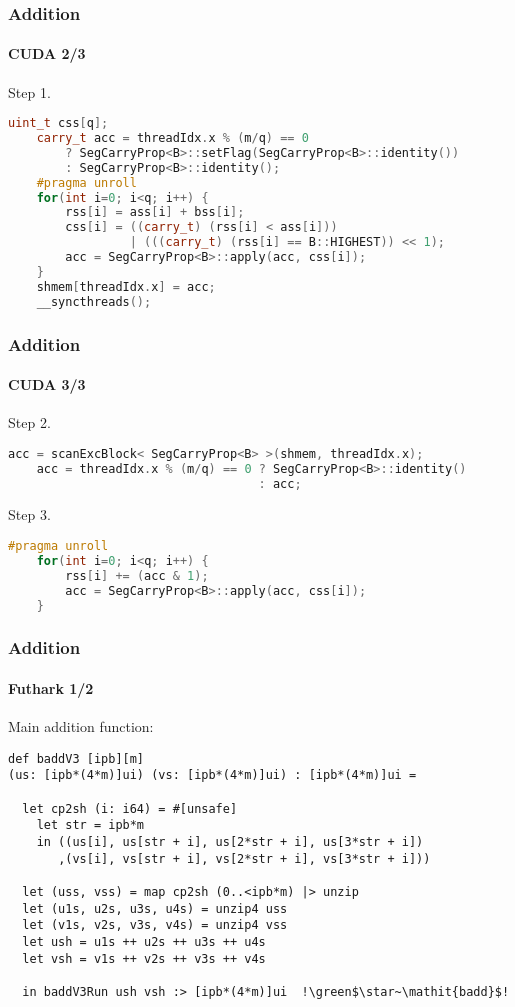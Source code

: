 \begin{frame}[fragile]
  \frametitle{Addition}
  \framesubtitle{CUDA 2/3}
  Step 1.
  \begin{lstlisting}[language=CPP,gobble=4,basicstyle=\scriptsize,firstnumber=18]
    uint_t css[q];
    carry_t acc = threadIdx.x % (m/q) == 0
        ? SegCarryProp<B>::setFlag(SegCarryProp<B>::identity())
        : SegCarryProp<B>::identity();
    #pragma unroll
    for(int i=0; i<q; i++) {
        rss[i] = ass[i] + bss[i];
        css[i] = ((carry_t) (rss[i] < ass[i]))
                 | (((carry_t) (rss[i] == B::HIGHEST)) << 1);
        acc = SegCarryProp<B>::apply(acc, css[i]);
    }
    shmem[threadIdx.x] = acc;
    __syncthreads();
\end{lstlisting}
\end{frame}

\begin{frame}[fragile]
  \frametitle{Addition}
  \framesubtitle{CUDA 3/3}
  Step 2.
  \begin{lstlisting}[language=CPP,gobble=4,basicstyle=\scriptsize,firstnumber=31]
    acc = scanExcBlock< SegCarryProp<B> >(shmem, threadIdx.x);
    acc = threadIdx.x % (m/q) == 0 ? SegCarryProp<B>::identity()
                                   : acc;
\end{lstlisting}
  Step 3.
\begin{lstlisting}[language=CPP,gobble=4,basicstyle=\scriptsize,firstnumber=34]
    #pragma unroll
    for(int i=0; i<q; i++) {
        rss[i] += (acc & 1);
        acc = SegCarryProp<B>::apply(acc, css[i]);
    }
\end{lstlisting}
\end{frame}

\begin{frame}[fragile]
  \frametitle{Addition}
  \framesubtitle{Futhark 1/2}
  Main addition function:
\begin{lstlisting}[language=futhark,gobble=0,basicstyle=\scriptsize,escapeinside=!!]
def baddV3 [ipb][m]
(us: [ipb*(4*m)]ui) (vs: [ipb*(4*m)]ui) : [ipb*(4*m)]ui =

  let cp2sh (i: i64) = #[unsafe]
    let str = ipb*m
    in ((us[i], us[str + i], us[2*str + i], us[3*str + i])
       ,(vs[i], vs[str + i], vs[2*str + i], vs[3*str + i]))

  let (uss, vss) = map cp2sh (0..<ipb*m) |> unzip
  let (u1s, u2s, u3s, u4s) = unzip4 uss
  let (v1s, v2s, v3s, v4s) = unzip4 vss
  let ush = u1s ++ u2s ++ u3s ++ u4s
  let vsh = v1s ++ v2s ++ v3s ++ v4s

  in baddV3Run ush vsh :> [ipb*(4*m)]ui  !\green$\star~\mathit{badd}$!
\end{lstlisting}
\end{frame}

